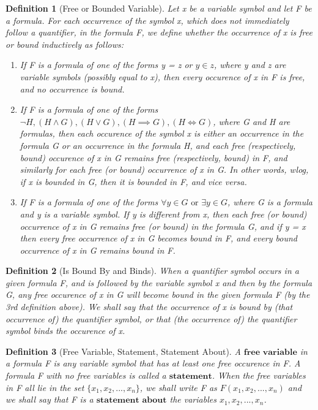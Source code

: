 \documentclass[11pt, oneside]{book}
\theoremstyle{break}
\newtheorem{defn}{Definition}[section]
\begin{document}
\begin{defn}[Free or Bounded Variable]
	Let x be a variable symbol and let F be a formula. For each occurrence of the symbol x, which does not immediately follow a quantifier, in the formula F, we define whether the occurrence of x is free or bound inductively as follows:
	\begin{enumerate}
		\item If F is a formula of one of the forms y = z or $y \in z$, where y and z are variable symbols (possibly equal to x), then every occurence of x in F is free, and no occurrence is bound.

		\item If F is a formula of one of the forms $\neg H, (H \land G), (H \lor G), (H \implies G), (H \iff G)$, where G and H are formulas, then each occurence of the symbol x is either an occurrence in the formula G or an occurrence in the formula H, and each free (respectively, bound) occurence of x in G remains free (respectively, bound) in F, and similarly for each free (or bound) occurrence of x in G. In other words, wlog, if x is bounded in G, then it is bounded in F, and vice versa.
		\item If F is a formula of one of the forms $\forall y \in G \text{ or } \exists y \in G$, where G is a formula and y is a variable symbol. If y is different from x, then each free (or bound) occurrence of x in G remains free (or bound) in the formula G, and if y = x then every free occurrence of x in G becomes bound in F, and every bound occurrence of x in G remains bound in F.
	\end{enumerate}
\end{defn}

\begin{defn}[Is Bound By and Binds]
	When a quantifier symbol occurs in a given formula F, and is followed by the variable symbol x and then by the formula G, any free occurence of x in G will become bound in the given formula F (by the 3rd definition above). We shall say that the occurrence of x is bound by (that occurrence of) the quantifier symbol, or that (the occurrence of) the quantifier symbol binds the occurence of x.
\end{defn}

\begin{defn}[Free Variable, Statement, Statement About]
	A $\textbf{free variable}$ in a formula F is any variable symbol that has at least one free occurence in F. A formula F with no free variables is called a $\textbf{statement}$. When the free variables in F all lie in the set $\{x_1, x_2, ..., x_n\}$, we shall write F as $F(x_1, x_2, ..., x_n)$ and we shall say that F is a $\textbf{statement about}$ the variables $x_1, x_2, ..., x_n$.
\end{defn}
\end{document}

